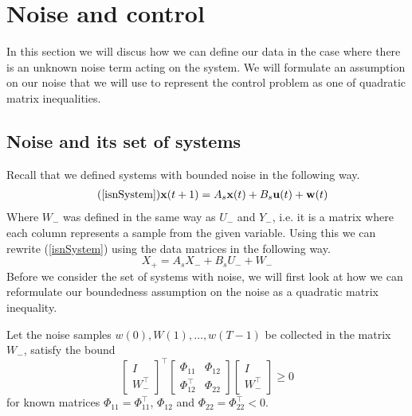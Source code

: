 \section{Noise and control} \label{sectionNoise}
In this section we will discus how we can define our data in the case where there is an unknown noise term acting on the system. We will formulate an assumption on our noise that we will use to represent the control problem as one of quadratic matrix inequalities. 

\subsection{Noise and its set of systems}
Recall that we defined systems with bounded noise in the following way.
\begin{align} \tag{\ref{isnSystem}}
\mathbf{x}(t+1) &= A_s \mathbf{x}(t) + B_s \mathbf{u}(t) + \mathbf{w}(t)
\end{align}
Where $W_-$ was defined in the same way as $U_-$ and $Y_-$, i.e. it is a matrix where each column represents a sample from the given variable. Using this we can rewrite (\ref{isnSystem}) using the data matrices in the following way.
\begin{equation} \label{isnSystemData}
	X_+ = A_s X_- + B_s U_- + W_-
\end{equation}
Before we consider the set of systems with noise, we will first look at how we can reformulate our boundedness assumption on the noise as a quadratic matrix inequality.

\cite[Assumption 1]{waarde2020noisy}
Let the noise samples $w(0),W(1),\dots,w(T-1)$ be collected in the matrix $W_-$, satisfy the bound
\begin{equation} \label{noiseBound}
	\begin{bmatrix} I \\ W_-^\top \end{bmatrix} ^\top
	\begin{bmatrix} \Phi_{11} & \Phi_{12} \\ \Phi_{12}^\top & \Phi_{22} \end{bmatrix}
	\begin{bmatrix} I \\ W_-^\top \end{bmatrix} \geq 0
\end{equation}
for known matrices $\Phi_{11} = \Phi_{11}^\top$, $\Phi_{12}$ and $\Phi_{22} = \Phi_{22}^\top < 0$.


